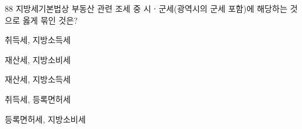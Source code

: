 \begin{question}{88}
지방세기본법상 부동산 관련 조세 중 시ㆍ군세(광역시의 군세 포함)에 해당하는 것으로 옳게 묶인 것은?
\begin{choices}
  \item 취득세, 지방소득세
  \item 재산세, 지방소비세
  \item 재산세, 지방소득세
  \item 취득세, 등록면허세
  \item 등록면허세, 지방소비세
\end{choices}
\end{question}
